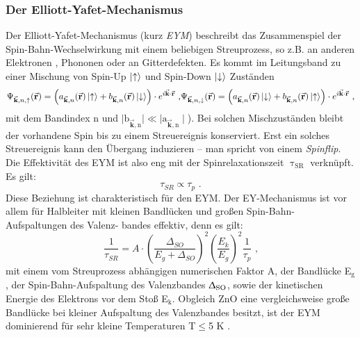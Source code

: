\subsubsection{Der Elliott-Yafet-Mechanismus}
Der Elliott-Yafet-Mechanismus (kurz \textit{EYM})\cite{Elliott.1954,Yafet.1963} beschreibt das Zusammenspiel der Spin-Bahn-Wechselwirkung mit einem beliebigen Streuprozess, so z.B. an anderen Elektronen \cite{Boguslawski.1980}, Phononen oder an Gitterdefekten. Es kommt im Leitungsband zu einer Mischung von Spin-Up $\ket{\uparrow}$ und Spin-Down $\ket{\downarrow}$ Zuständen
\begin{equation}
\Psi_{\vec{\textbf{k}},n,\uparrow}(\vec{\textbf{r}})=\left( a_{\vec{\textbf{k}},n}(\vec{\textbf{r}})\ket{\uparrow} + b_{\vec{\textbf{k}},n}(\vec{\textbf{r}})\ket{\downarrow}\right)\cdot e^{i \vec{\textbf{k}}\cdot \vec{\textbf{r}}} \text{ ,}\\
\Psi_{\vec{\textbf{k}},n,\downarrow}(\vec{\textbf{r}})=\left( a_{\vec{\textbf{k}},n}(\vec{\textbf{r}})\ket{\downarrow} + b_{\vec{\textbf{k}},n}(\vec{\textbf{r}})\ket{\uparrow}\right)\cdot e^{i \vec{\textbf{k}}\cdot \vec{\textbf{r}}} \text{ ,}
\end{equation}
mit dem Bandindex n und $\mid\text{b}_{\vec{\textbf{k}},\text{n}}\mid \ll \mid\text{a}_{\vec{\textbf{k}},\text{n}}\mid$). Bei solchen Mischzuständen bleibt der vorhandene Spin bis zu einem Streuereignis konserviert. Erst ein solches Streuereignis kann den Übergang induzieren – man spricht von einem \textit{Spinflip}. Die Effektivität des EYM ist also eng mit der Spinrelaxationszeit $\uptau_\text{SR}$ verknüpft. Es gilt: 
\begin{equation}
\tau_{SR} \propto \tau_{p} \text{ .}
\end{equation}
Diese Beziehung ist charakteristisch für den EYM. %
Der EY-Mechanismus ist vor \mbox{allem} für Halbleiter mit kleinen Bandlücken und großen Spin-Bahn-Aufspaltungen des Valenz- bandes effektiv, denn es gilt:
\begin{equation}
\frac{1}{\tau_{SR}}=A \cdot \left(\frac{\Delta_{SO}}{E_g+\Delta_{SO}}\right)^2 \left(\frac{E_k}{E_g}\right)^2  \frac{1}{\tau_p} \text{ ,}
\end{equation}
mit einem vom Streuprozess abhängigen numerischen Faktor A, der Bandlücke E$_\text{g}$, der Spin-Bahn-Aufspaltung des Valenzbandes $\Updelta_\text{SO}$, sowie der kinetischen Energie des Elektrons vor dem Stoß E$_\text{k}$. Obgleich ZnO eine vergleichsweise große Bandlücke bei kleiner Aufspaltung des Valenzbandes besitzt, ist der EYM dominierend für sehr kleine Temperaturen T$\leq$5 K \cite{Buyanova.2010,Whittaker.1996}.
